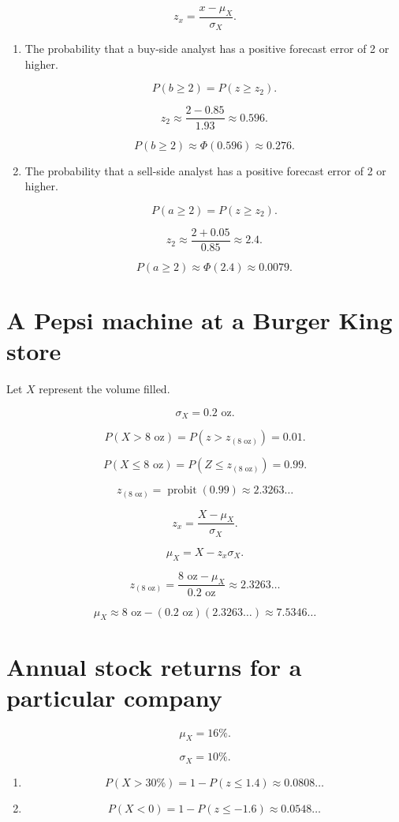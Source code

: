 \documentclass[12pt]{article}
\DeclareMathOperator{\probit}{probit}
\begin{document}
\[z_x=\frac{x-\mu_X}{\sigma_X}.\]
\begin{enumerate}
\item The probability that a buy-side analyst has a positive forecast error of 2 or higher.

\[P(b\geq 2)=P(z\geq z_2).\]

\[z_2\approx\frac{2-0.85}{1.93}\approx 0.596.\]

\[P(b\geq 2)\approx\Phi(0.596)\approx 0.276.\]
\item The probability that a sell-side analyst has a positive forecast error of 2 or higher.

\[P(a\geq 2)=P(z\geq z_2).\]

\[z_2\approx\frac{2+0.05}{0.85}\approx 2.4.\]

\[P(a\geq 2)\approx\Phi(2.4)\approx 0.0079.\]
\end{enumerate}
\section{A Pepsi machine at a Burger King store}
Let $X$ represent the volume filled.

\[\sigma_X=0.2\text{ oz}.\]

\[P(X>8\text{ oz})=P\left(z>z_{(8\text{ oz})}\right)=0.01.\]

\[P(X\leq 8\text{ oz})=P\left(Z\leq z_{(8\text{ oz})}\right)=0.99.\]

\[z_{(8\text{ oz})}=\probit(0.99)\approx 2.3263\dots\]

\[z_x=\frac{X-\mu_X}{\sigma_X}.\]

\[\mu_X=X-z_x\sigma_X.\]

\[z_{(8\text{ oz})}=\frac{8\text{ oz}-\mu_X}{0.2\text{ oz}}\approx 2.3263\dots\]

\[\mu_X\approx 8\text{ oz}-(0.2\text{ oz})(2.3263\dots)\approx 7.5346\dots\]
\section{Annual stock returns for a particular company}
\[\mu_X=16\%.\]

\[\sigma_X=10\%.\]

\begin{enumerate}
    \item\[P(X>30\%)=1-P(z\leq 1.4)\approx 0.0808\dots\]
    \item\[P(X<0)=1-P(z\leq -1.6)\approx 0.0548\dots\]
\end{enumerate}
\end{document}
